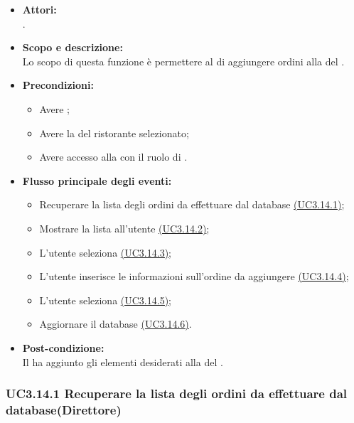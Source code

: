 \begin{itemize}
	\item \textbf{Attori:}
	\\.
	\item \textbf{Scopo e descrizione:} 
	\\Lo scopo di questa funzione è permettere al  di aggiungere ordini alla  del .
	\item \textbf{Precondizioni:}
	\begin{itemize}
		\item Avere ;
		\item Avere la  del ristorante selezionato;
		\item Avere accesso alla  con il ruolo di .
	\end{itemize}
	\item \textbf{Flusso principale degli eventi:}
	\begin{itemize}
		\item Recuperare la lista degli ordini da effettuare dal database \hyperref[UC3.14.1]{(UC3.14.1)};
		\item Mostrare la lista all'utente \hyperref[UC3.14.2]{(UC3.14.2)};
		\item L'utente  seleziona  \hyperref[UC3.14.3]{(UC3.14.3)};
		\item L'utente  inserisce le informazioni sull'ordine da aggiungere \hyperref[UC3.14.4]{(UC3.14.4)};
		\item L'utente  seleziona  \hyperref[UC3.14.5]{(UC3.14.5)};
		\item Aggiornare il database \hyperref[UC3.14.6]{(UC3.14.6)}.
	\end{itemize}
	\item \textbf{Post-condizione:}
	\\Il {} ha aggiunto gli elementi desiderati alla  del .
\end{itemize}

\subsubsection{UC3.14.1 Recuperare la lista degli ordini da effettuare dal database(Direttore)} \label{UC3.14.1}

